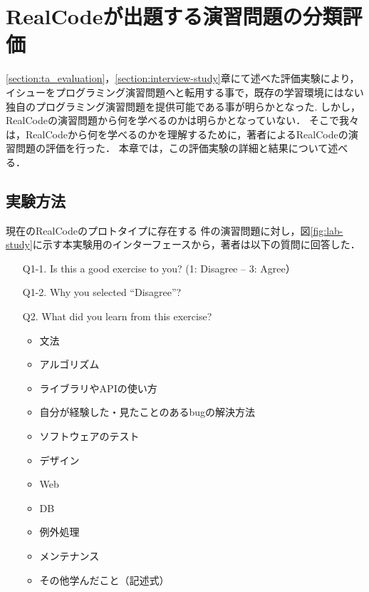 
\chapter{RealCodeが出題する演習問題の分類評価}
\label{section:lab-study}
\graphicspath{{Chapters_evaluation/Figs/}}


\ref{section:ta_evaluation}，\ref{section:interview-study}章にて述べた評価実験により，イシューをプログラミング演習問題へと転用する事で，既存の学習環境にはない独自のプログラミング演習問題を提供可能である事が明らかとなった.
しかし，RealCodeの演習問題から何を学べるのかは明らかとなっていない．
そこで我々は，RealCodeから何を学べるのかを理解するために，著者によるRealCodeの演習問題の評価を行った．
本章では，この評価実験の詳細と結果について述べる．


\section{実験方法}

現在のRealCodeのプロトタイプに存在する \xxx 件の演習問題に対し，図\ref{fig:lab-study}に示す本実験用のインターフェースから，著者は以下の質問に回答した．

\begin{itemize}
  \item[Q1-1.] Is this a good exercise to you? (1: Disagree -- 3: Agree）
  \item[Q1-2.] Why you selected ``Disagree''?
  \item[Q2.] What did you learn from this exercise?
  \begin{itemize}
  	  \item 文法
   	  \item アルゴリズム
      \item ライブラリやAPIの使い方
      \item 自分が経験した・見たことのあるbugの解決方法
      \item ソフトウェアのテスト
      \item デザイン
      \item Web
      \item DB
      \item 例外処理
      \item メンテナンス
      \item その他学んだこと（記述式）
  \end{itemize}
\end{itemize}

